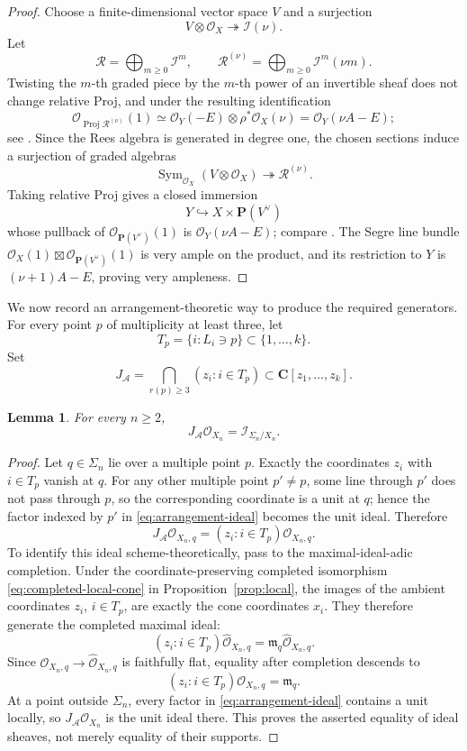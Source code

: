 \documentclass[11pt]{article}
\newtheorem{lemma}[theorem]{Lemma}
\newcommand{\PP}{\mathbf P}
\newcommand{\CC}{\mathbf C}
\newcommand{\OO}{\mathcal O}
\newcommand{\cI}{\mathcal I}
\newcommand{\cA}{\mathcal A}
\begin{document}
\begin{proof}
Choose a finite-dimensional vector space $V$ and a surjection
\[
        V\otimes\OO_X\twoheadrightarrow\cI(\nu).
\]
Let
\[
 \mathcal R=\bigoplus_{m\ge0}\cI^m,
 \qquad
 \mathcal R^{(\nu)}=\bigoplus_{m\ge0}\cI^m(\nu m).
\]
Twisting the $m$-th graded piece by the $m$-th power of an invertible sheaf does
not change relative Proj, and under the resulting identification
\[
 \OO_{\operatorname{Proj}\mathcal R^{(\nu)}}(1)
 \simeq \OO_Y(-E)\otimes\rho^*\OO_X(\nu)
 =\OO_Y(\nu A-E);
\]
see \cite[II, Lemma~7.9]{Hartshorne}.  Since the Rees algebra is generated in
degree one, the chosen sections induce a surjection of graded algebras
\[
 \operatorname{Sym}_{\OO_X}(V\otimes\OO_X)
 \twoheadrightarrow\mathcal R^{(\nu)}.
\]
Taking relative Proj gives a closed immersion
\[
        Y\hookrightarrow X\times\PP(V^\vee)
\]
whose pullback of $\OO_{\PP(V^\vee)}(1)$ is $\OO_Y(\nu A-E)$; compare
\cite[II,~3.6.2]{EGAII}.  The Segre line bundle
$\OO_X(1)\boxtimes\OO_{\PP(V^\vee)}(1)$ is very ample on the product, and its
restriction to $Y$ is $(\nu+1)A-E$, proving very ampleness.
\end{proof}

We now record an arrangement-theoretic way to produce the required generators.
For every point $p$ of multiplicity at least three, let
\[
        T_p=\{i:L_i\ni p\}\subset\{1,\ldots,k\}.
\]
Set
\begin{equation}\label{eq:arrangement-ideal}
        J_{\cA}=\bigcap_{r(p)\ge3}(z_i:i\in T_p)
        \subset\CC[z_1,\ldots,z_k].
\end{equation}

\begin{lemma}\label{lem:singular-ideal-general}
For every $n\ge2$,
\[
        J_{\cA}\OO_{X_n}=\cI_{\Sigma_n/X_n}.
\]
\end{lemma}

\begin{proof}
Let $q\in\Sigma_n$ lie over a multiple point $p$.  Exactly the coordinates
$z_i$ with $i\in T_p$ vanish at $q$.  For any other multiple point $p'\ne p$,
some line through $p'$ does not pass through $p$, so the corresponding
coordinate is a unit at $q$; hence the factor indexed by $p'$ in
\eqref{eq:arrangement-ideal} becomes the unit ideal.  Therefore
\[
        J_{\cA}\OO_{X_n,q}=(z_i:i\in T_p)\OO_{X_n,q}.
\]
To identify this ideal scheme-theoretically, pass to the maximal-ideal-adic
completion.  Under the coordinate-preserving completed isomorphism
\eqref{eq:completed-local-cone} in Proposition~\ref{prop:local}, the images of
the ambient coordinates $z_i$, $i\in T_p$, are exactly the cone coordinates
$x_i$.  They therefore generate the completed maximal ideal:
\[
 (z_i:i\in T_p)\widehat{\OO}_{X_n,q}
     =\mathfrak m_q\widehat{\OO}_{X_n,q}.
\]
Since $\OO_{X_n,q}\to\widehat{\OO}_{X_n,q}$ is faithfully flat, equality after
completion descends to
\[
        (z_i:i\in T_p)\OO_{X_n,q}=\mathfrak m_q.
\]
At a point outside $\Sigma_n$, every factor in
\eqref{eq:arrangement-ideal} contains a unit locally, so
$J_{\cA}\OO_{X_n}$ is the unit ideal there.  This proves the asserted equality
of ideal sheaves, not merely equality of their supports.
\end{proof}
\end{document}
